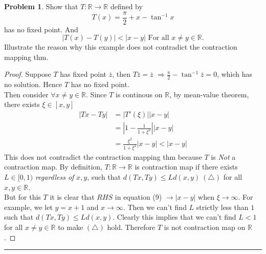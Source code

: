 \documentclass[a4paper, 10pt]{article}
\theoremstyle{definition}
\newtheorem{problem}{Problem}
\theoremstyle{hSol}
\begin{document}
\begin{problem} Show that $T: \mathbb{R} \to \mathbb{R}$ defined by
$$ T(x) = \frac{\pi}{2}+x -\tan^{-1}x $$
has no fixed point. And
$$ |T(x)-T(y)| < |x-y| \text{ For all $x\ne y\in \mathbb{R}$.} $$
Illustrate the reason why this example does not contradict the contraction mapping thm.
\end{problem}
\begin{proof} Suppose $T$ has fixed point $\bar{z}$, then $T\bar{z}=\bar{z}$ $\Rightarrow \frac{\pi}{2}-\tan^{-1}\bar{z}=0$, which has no solution. Hence $T$ has no fixed point. \\
Then consider $\forall x\ne y \in \mathbb{R}$. Since $T$ is continous on $\mathbb{R}$, by mean-value theorem, there exists $\xi \in [x,y]$
\begin{equation}
  \begin{split}
    |Tx-Ty|&=|T'(\xi)||x-y|\\
    &=\left|1-\frac{1}{1+\xi^2}\right||x-y|\\
    &=\frac{\xi^2}{1+\xi^2}|x-y|<|x-y|
  \end{split}
\end{equation}
This does not contradict the contraction mapping thm because $T$ is \textit{Not} a contraction map. By definition, $T:\mathbb{R}\to \mathbb{R}$ is contraction map if there exists $L\in[0,1)$ \textit{regardless of} $x,y$, such that $d(Tx, Ty)\leq Ld(x,y)~(\triangle)$ for all $x,y \in \mathbb{R}$.\\
But for this $T$ it is clear that $RHS$ in equation (9) $\to |x-y|$ when $\xi \to \infty$. For example, we let $y=x+1$ and $x\to \infty$. Then we can't find $L$ strictly less than $1$ such that $d(Tx, Ty)\leq Ld(x,y)$. Clearly this implies that we can't find $L<1$ for all $x\ne y\in \mathbb{R}$ to make $(\triangle)$ hold. Therefore $T$ is not contraction map on $\mathbb{R}$.
\end{proof}

\noindent\rule{16cm}{0.4pt}
\end{document}
